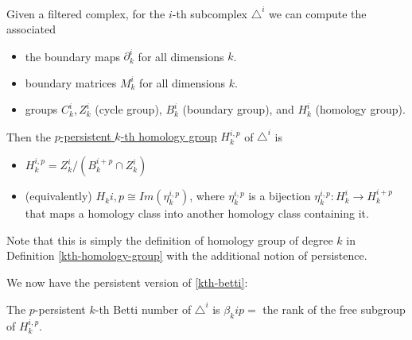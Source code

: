 \begin{defn}
Given a filtered complex, for the $i$-th subcomplex $\triangle^i$ we can compute the associated 
\begin{itemize}
    \item the boundary maps $\partial_k^i$ for all dimensions $k$.
    \item boundary matrices $M_k^i$ for all dimensions $k$.
    \item groups $C_k^i, Z_k^i$ (cycle group), $B_k^i$ (boundary group), and $H_k^i$ (homology group).
\end{itemize}
Then the \underline{$p$-persistent $k$-th homology group} $H_k^{i,p}$ of $\triangle^i$ is 
\begin{itemize}
    \item $H_k^{i,p} = Z_k^i / (B_k^{i+p}\cap Z_k^i)$
    \item (equivalently) $H_k{i,p} \cong Im(\eta_k^{i,p})$, where $\eta_k^{i,p}$ is a bijection $\eta_k^{i,p}: H_k^i \to H_k^{i+p}$ that maps a homology class into another homology class containing it.   
\end{itemize}
Note that this is simply the definition of homology group of degree $k$ in Definition \ref{kth-homology-group} with the additional notion of persistence.
\end{defn}

\begin{defn}
We now have the persistent version of \ref{kth-betti}:

The $p$-persistent $k$-th Betti number of $\triangle^i$ is $\beta_k{i p} = $ the rank of the free subgroup of $H_k^{i,p}$.
\end{defn}


